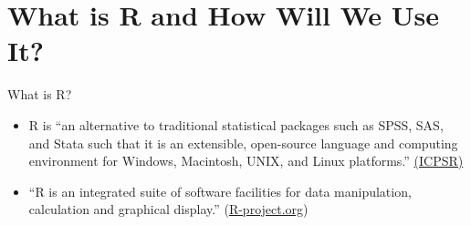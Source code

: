 \documentclass[
  8pt,
  ignorenonframetext,
  dvipsnames]{beamer}
\providecommand{\tightlist}{%
  \setlength{\itemsep}{0pt}\setlength{\parskip}{0pt}}
\let\olditem\item
\renewcommand{\item}{%
  \olditem\vspace{4pt}
}
\begin{document}
\hypertarget{what-is-r-and-how-will-we-use-it}{%
\section{What is R and How Will We Use
It?}\label{what-is-r-and-how-will-we-use-it}}

\begin{frame}{What is R?}
\protect\hypertarget{what-is-r}{}

\begin{itemize}
\tightlist
\item
  R is ``an alternative to traditional statistical packages such as
  SPSS, SAS, and Stata such that it is an extensible, open-source
  language and computing environment for Windows, Macintosh, UNIX, and
  Linux platforms.''
  \href{https://www.icpsr.umich.edu/icpsrweb/content/shared/ICPSR/faqs/what-is-r.html}{(ICPSR)}
\end{itemize}

\medskip

\begin{itemize}
\tightlist
\item
  ``R is an integrated suite of software facilities for data
  manipulation, calculation and graphical display.''
  (\href{https://www.r-project.org/about.html}{R-project.org})
\end{itemize}

\end{frame}
\end{document}
